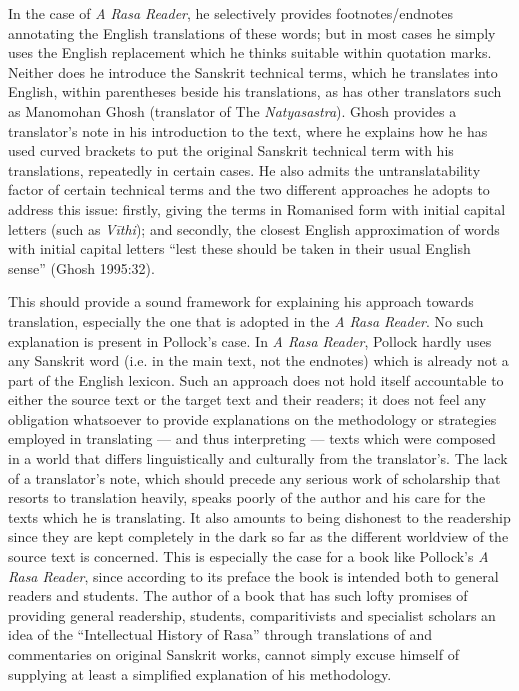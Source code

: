 In the case of \textsl{A Rasa Reader}, he selectively provides footnotes/endnotes annotating the English translations of these words; but in most cases he simply uses the English replacement which he thinks suitable within quotation marks. Neither does he introduce the Sanskrit technical terms, which he translates into English, within parentheses beside his translations, as has other translators such as Manomohan Ghosh (translator of The \textsl{Natyasastra}). Ghosh provides a translator’s note in his introduction to the text, where he explains how he has used curved brackets to put the original Sanskrit technical term with his translations, repeatedly in certain cases. He also admits the untranslatability factor of certain technical terms and the two different approaches he adopts to address this issue: firstly, giving the terms in Romanised form with initial capital letters (such as \textsl{Vīthi}); and secondly, the closest English approximation of words with initial capital letters “lest these should be taken in their usual English sense” (Ghosh 1995:32). 

This should provide a sound framework for explaining his approach towards translation, especially the one that is adopted in the \textsl{A Rasa Reader}. No such explanation is present in Pollock’s case. In \textsl{A Rasa Reader}, Pollock hardly uses any Sanskrit word (i.e. in the main text, not the endnotes) which is already not a part of the English lexicon. Such an approach does not hold itself accountable to either the source text or the target text and their readers; it does not feel any obligation whatsoever to provide explanations on the methodology or strategies employed in translating --- and thus interpreting --- texts which were composed in a world that differs linguistically and culturally from the translator’s. The lack of a translator’s note, which should precede any serious work of scholarship that resorts to translation heavily, speaks poorly of the author and his care for the texts which he is translating. It also amounts to being dishonest to the readership since they are kept completely in the dark so far as the different worldview of the source text is concerned. This is especially the case for a book like Pollock’s \textsl{A Rasa Reader}, since according to its preface the book is intended both to general readers and students. The author of a book that has such lofty promises of providing general readership, students, comparitivists and specialist scholars an idea of the “Intellectual History of Rasa” through translations of and commentaries on original Sanskrit works, cannot simply excuse himself of supplying at least a simplified explanation of his methodology. 

